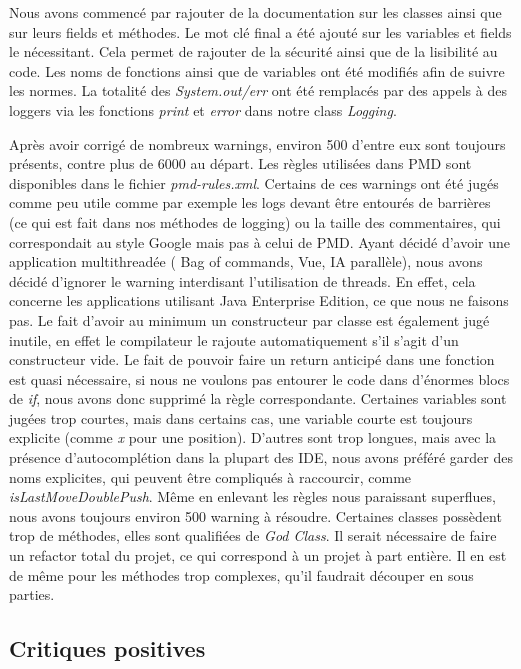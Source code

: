 \documentclass{article}
\begin{document}
Nous avons commencé par rajouter de la documentation sur les classes ainsi que sur leurs fields et méthodes.
Le mot clé final a été ajouté sur les variables et fields le nécessitant. Cela permet de rajouter de la sécurité ainsi que de la lisibilité au code.
Les noms de fonctions ainsi que de variables ont été modifiés afin de suivre les normes.
La totalité des \textit{System.out/err} ont été remplacés par des appels à des loggers via les fonctions \textit{print} et \textit{error} dans notre class \textit{Logging}.

Après avoir corrigé de nombreux warnings, environ 500 d'entre eux sont toujours présents, contre plus de 6000 au départ.
Les règles utilisées dans PMD sont disponibles dans le fichier \textit{pmd-rules.xml}.
Certains de ces warnings ont été jugés
comme peu utile comme par exemple les logs devant être entourés de barrières (ce qui est fait dans nos méthodes de logging) ou la taille des commentaires,
qui correspondait au style Google mais pas à celui de PMD.
Ayant décidé d'avoir une application multithreadée ( Bag of commands, Vue, IA parallèle), nous avons décidé d'ignorer le warning interdisant l'utilisation de threads.
En effet, cela concerne les applications utilisant Java Enterprise Edition, ce que nous ne faisons pas.
Le fait d'avoir au minimum un constructeur par classe est également jugé inutile, en effet le compilateur le rajoute automatiquement s'il s'agit d'un constructeur vide.
Le fait de pouvoir faire un return anticipé dans une fonction est quasi nécessaire, si nous ne voulons pas entourer le code dans
d'énormes blocs de \textit{if}, nous avons donc supprimé la règle correspondante.
Certaines variables sont jugées trop courtes, mais dans certains cas, une variable courte est toujours explicite (comme \textit{x} pour une position).
D'autres sont trop longues, mais avec la présence d'autocomplétion dans la plupart des IDE, nous avons préféré garder des noms explicites, qui peuvent être compliqués à raccourcir,
comme \textit{isLastMoveDoublePush}.
Même en enlevant les règles nous paraissant superflues, nous avons toujours environ 500 warning à résoudre.
Certaines classes possèdent trop de méthodes, elles sont qualifiées de \textit{God Class}. Il serait nécessaire de faire un refactor total du projet, ce qui correspond à un projet à part entière.
Il en est de même pour les méthodes trop complexes, qu'il faudrait découper en sous parties.

\subsection{Critiques positives}
\end{document}
